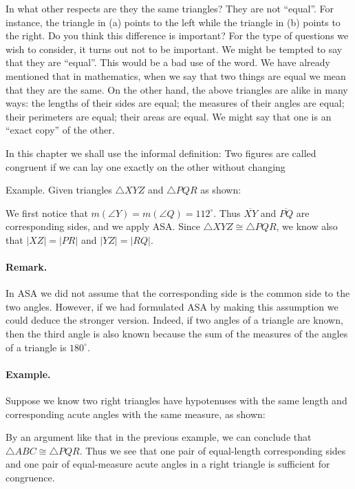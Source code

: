 \documentclass[12pt]{book} %
\begin{document}

In what other respects are they the same triangles? They are not ``equal''. For instance, the triangle in (a) points to the left while the triangle in (b) points to the right. Do you think this difference is important? For the type of questions we wish to consider, it turns out not to be important. We might be tempted to say that they are ``equal''. This would be a bad use of the word. We have already mentioned that in mathematics, when we say that two things are equal we mean that they are the same. On the other hand, the above triangles are alike in many ways: the lengths of their sides are equal; the measures of their angles are equal; their perimeters are equal; their areas are equal. We might say that one is an ``exact copy'' of the other.

In this chapter we shall use the informal definition: Two figures are called congruent if we can lay one exactly on the other without changing

Example. Given triangles $\triangle XYZ$ and $\triangle PQR$ as shown:


We first notice that $m(\angle Y)=m(\angle Q)=112^\circ$. Thus $\overline{XY}$ and $\overline{PQ}$ are corresponding sides, and we apply ASA. Since $\triangle XYZ\cong \triangle PQR$, we know also that $|XZ|=|PR|$ and $|YZ|=|RQ|$.

\paragraph{Remark.}
In ASA we did not assume that the corresponding side is the common side to the two angles. However, if we had formulated ASA by making this assumption we could deduce the stronger version. Indeed, if two angles of a triangle are known, then the third angle is also known because the sum of the measures of the angles of a triangle is $180^\circ$.

\paragraph{Example.}
Suppose we know two right triangles have hypotenuses with the same length and corresponding acute angles with the same measure, as shown:


By an argument like that in the previous example, we can conclude that $\triangle ABC\cong\triangle PQR$. Thus we see that one pair of equal-length corresponding sides and one pair of equal-measure acute angles in a right triangle is sufficient for congruence.
\end{document}
